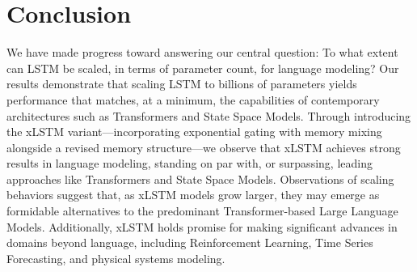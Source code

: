 \section{Conclusion}
We have made progress toward answering our central question: To what extent can LSTM be scaled, in terms of parameter count, for language modeling? Our results demonstrate that scaling LSTM to billions of parameters yields performance that matches, at a minimum, the capabilities of contemporary architectures such as Transformers and State Space Models. Through introducing the xLSTM variant—incorporating exponential gating with memory mixing alongside a revised memory structure—we observe that xLSTM achieves strong results in language modeling, standing on par with, or surpassing, leading approaches like Transformers and State Space Models. Observations of scaling behaviors suggest that, as xLSTM models grow larger, they may emerge as formidable alternatives to the predominant Transformer-based Large Language Models. Additionally, xLSTM holds promise for making significant advances in domains beyond language, including Reinforcement Learning, Time Series Forecasting, and physical systems modeling.

